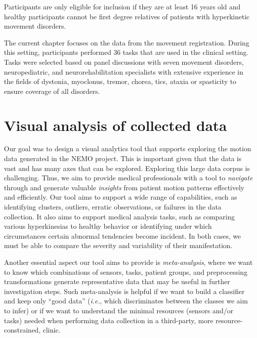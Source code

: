 Participants are only eligible for inclusion if they are at least 16 years old and healthy participants cannot be first degree relatives of patients with hyperkinetic movement disorders. 

The current chapter focuses on the data from the movement registration. During this setting, participants performed 36 tasks that are used in the clinical setting. Tasks were selected based on panel discussions with seven movement disorders, neuropediatric, and neurorehabilitation specialists with extensive experience in the fields of dystonia, myoclonus, tremor, chorea, tics, ataxia or spasticity to ensure coverage of all disorders.


\section{Visual analysis of collected data}
\label{sec:nemo_va}
%
Our goal was to design a visual analytics tool that supports exploring the motion data generated in the NEMO project. This is important given that the data is vast and has many axes that can be explored.
Exploring this large data corpus is challenging. Thus, we aim to provide medical professionals with a tool to \emph{navigate} through and generate valuable \emph{insights} from patient motion patterns effectively and efficiently. Our tool aims to support a wide range of capabilities, such as identifying clusters, outliers, erratic observations, or failures in the data collection. It also aims to support medical analysis tasks, such as comparing various hyperkinesias to healthy behavior or identifying under which circumstances certain abnormal tendencies become incident. In both cases, we must be able to compare the severity and variability of their manifestation.

Another essential aspect our tool aims to provide is \emph{meta-analysis}, where we want to know which combinations of sensors, tasks, patient groups, and preprocessing transformations generate representative data that may be useful in further investigation steps. Such meta-analysis is helpful if we want to build a classifier and keep only ``good data'' (\emph{i.e.}, which discriminates between the classes we aim to infer) or if we want to understand the minimal resources (sensors and/or tasks) needed when performing data collection in a third-party, more resource-constrained, clinic.

